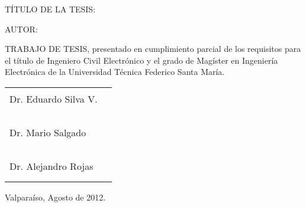 \cleardoublepage

\vspace{5mm}

\noindent T\'ITULO DE LA TESIS:

\vspace{5mm}

\vspace{20mm}

\noindent AUTOR:

\vspace{5mm}


\vspace{15mm}

\noindent TRABAJO DE TESIS, presentado en cumplimiento parcial de
los requisitos para el t\'itulo de Ingeniero Civil Electr\'onico y el
grado de Mag\'ister en Ingenier\'ia Electr\'onica de la Universidad
T\'ecnica Federico Santa Mar\'ia.

\vspace{15mm}

\begin{tabular}{p{60mm}c}
Dr. Eduardo Silva V. & \rule{60mm}{1pt} \\
& \\
& \\
& \\
Dr. Mario Salgado & \rule{60mm}{1pt} \\
& \\
& \\
& \\
Dr. Alejandro Rojas & \rule{60mm}{1pt} \\
&
\end{tabular}

\vspace{5mm}

\hfill Valpara\'iso, Agosto de 2012.


\cleardoublepage
\newpage
\thispagestyle{empty}
\mbox{}
\cleardoublepage

\vspace{50mm}

\begin{flushright}


\end{flushright}
